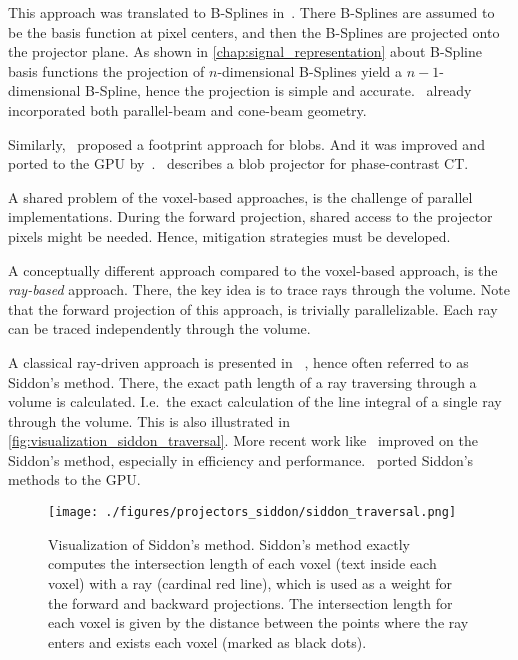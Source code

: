 This approach was translated to B-Splines in~\cite{momey_b-spline_2012, momey_spline_2015}. There
B-Splines are assumed to be the basis function at pixel centers, and then the B-Splines are
projected onto the projector plane. As shown in \autoref{chap:signal_representation} about B-Spline
basis functions the projection of \(n\)-dimensional B-Splines yield a \(n-1\)-dimensional B-Spline,
hence the projection is simple and accurate.~\cite{momey_b-spline_2012} already incorporated both
parallel-beam and cone-beam geometry.

Similarly,~\cite{ziegler_efficient_2006} proposed a footprint approach for blobs. And it was
improved and ported to the \gls{GPU} by~\cite{bippus_projector_2011}.~\cite{kohler_iterative_2011}
describes a blob projector for phase-contrast CT\@.

A shared problem of the voxel-based approaches, is the challenge of parallel implementations. During
the forward projection, shared access to the projector pixels might be needed. Hence, mitigation
strategies must be developed.

A conceptually different approach compared to the voxel-based approach, is the \textit{ray-based}
approach. There, the key idea is to trace rays through the volume. Note that the forward projection
of this approach, is trivially parallelizable. Each ray can be traced independently through the
volume.

A classical ray-driven approach is presented in
\citeauthor*{siddon_fast_1985}~\cite{siddon_fast_1985}, hence often referred to as Siddon's method.
There, the exact path length of a ray traversing through a volume is calculated. I.e.\ the exact
calculation of the line integral of a single ray through the volume. This is also illustrated in
\autoref{fig:visualization_siddon_traversal}. More recent work like~\cite{jacobs_fast_1998,
	christiaens_fast_1999, zhao_fast_2004, gao_fast_2012} improved on the Siddon's method,
especially in efficiency and performance.~\cite{de_greef_accelerated_2009, xiao_efficient_2012}
ported Siddon's methods to the \gls{GPU}\@.

\begin{figure}
	\centering
	\texttt{[image: ./figures/projectors\_siddon/siddon\_traversal.png]}
	\caption{Visualization of Siddon's method. Siddon's method exactly computes the intersection
		length of each voxel (text inside each voxel) with a ray (cardinal red line), which
		is used as a weight for the forward and backward projections. The intersection
		length for each voxel is given by the distance between the points where the ray
		enters and exists each voxel (marked as black
		dots).}\label{fig:visualization_siddon_traversal}
\end{figure}

